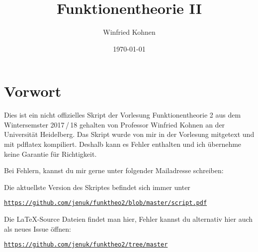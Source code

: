 \documentclass[]{scrbook}
\title{Funktionentheorie II}
\author{Winfried Kohnen}
\date{\today}
\begin{document}
\pagestyle{plain}

\maketitle

\chapter*{Vorwort}

Dies ist ein nicht offizielles Skript der Vorlesung Funktionentheorie 2 aus dem Wintersemster 2017\,/\,18 gehalten von Professor Winfried Kohnen an der Universität Heidelberg.
Das Skript wurde von mir in der Vorlesung mitgetext und mit pdflatex kompiliert.
Deshalb kann es Fehler enthalten und ich übernehme keine Garantie für Richtigkeit.

\noindent Bei Fehlern, kannst du mir gerne unter folgender Mailadresse schreiben:

\begin{center}
\end{center}

\noindent Die aktuellste Version des Skriptes befindet sich immer unter
\begin{center}
\texttt{\url{https://github.com/jenuk/funktheo2/blob/master/script.pdf}}
\end{center}

\noindent Die \LaTeX-Source Dateien findet man hier, Fehler kannst du alternativ hier auch als neues Issue öffnen:
\begin{center}
\texttt{\url{https://github.com/jenuk/funktheo2/tree/master}}
\end{center}

\clearpage
{}
{}
\tableofcontents

\clearpage
{}
\setcounter{page}{0}
\pagestyle{fancy}








\printindex

\cleardoublepage
{}
{}
\end{document}
